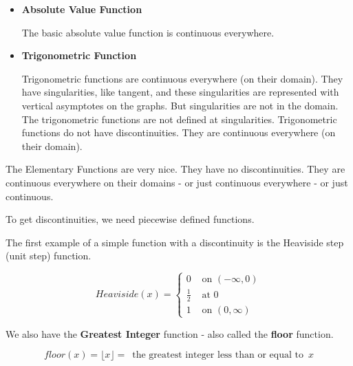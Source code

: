 \documentclass{ximera}
\begin{document}
\begin{itemize}
\item \textbf{\textcolor{blue!55!black}{Absolute Value Function}} 

The basic absolute value function is continuous everywhere.







\item \textbf{\textcolor{blue!55!black}{Trigonometric Function}} 

Trigonometric functions are continuous everywhere (on their domain).  They have singularities, like tangent, and these singularities are represented with vertical asymptotes on the graphs.  But singularities are not in the domain.  The trigonometric functions are not defined at singularities. Trigonometric functions do not have discontinuities.  They are continuous everywhere (on their domain). 








\end{itemize}




The Elementary Functions are very nice.  They have no discontinuities.  They are continuous everywhere on their domains - or just continuous everywhere - or just continuous.



To get discontinuities, we need piecewise defined functions.

The first example of a simple function with a discontinuity is the Heaviside step (unit step) function.






\[
Heaviside(x) = 
\begin{cases}
  0 & \text{ on } (-\infty, 0) \\
  \tfrac{1}{2} & \text{ at } 0 \\
  1 & \text{ on } (0, \infty) 
\end{cases}
\]






We also have the \textbf{Greatest Integer} function - also called the \textbf{floor} function.


\[
floor(x) = \lfloor x \rfloor = \, \text{ the greatest integer less than or equal to } \, x
\]
\end{document}
